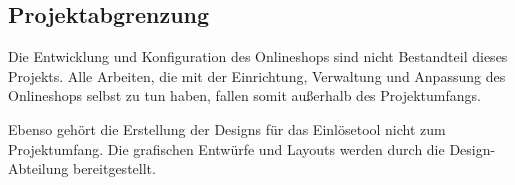 \subsection{Projektabgrenzung} 
\label{sec:Projektabgrenzung}

Die Entwicklung und Konfiguration des Onlineshops sind nicht Bestandteil dieses Projekts. Alle Arbeiten, die mit der Einrichtung, Verwaltung und Anpassung des Onlineshops selbst zu tun haben, fallen somit außerhalb des Projektumfangs.

Ebenso gehört die Erstellung der Designs für das Einlösetool nicht zum Projektumfang. Die grafischen Entwürfe und Layouts werden durch die Design-Abteilung bereitgestellt.